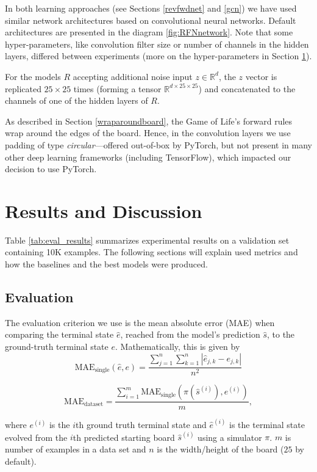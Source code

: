 \documentclass[conference]{IEEEtran}
\begin{document}
In both learning approaches (see Sections \ref{revfwdnet} and \ref{gcn}) we have used similar network architectures based on convolutional neural networks. Default architectures are presented in the diagram \ref{fig:RFNnetwork}. Note that some hyper-parameters, like convolution filter size or number of channels in the hidden layers, differed between experiments (more on the hyper-parameters in Section \ref{results}).

For the models $R$ accepting additional noise input $z \in \mathbb{R}^d$, the $z$ vector is replicated $25 \times 25$ times (forming a tensor $\mathbb{R}^{d\times25\times25}$) and concatenated to the channels of one of the hidden layers of $R$.

As described in Section \ref{wraparoundboard}, the Game of Life's forward rules wrap around the edges of the board. Hence, in the convolution layers we use padding of type {\it circular}---offered out-of-box by PyTorch, but not present in many other deep learning frameworks (including TensorFlow), which impacted our decision to use PyTorch.


\section{Results and Discussion}
\label{results}
Table \ref{tab:eval_results} summarizes experimental results on a validation set containing 10K examples. The following sections will explain used metrics and how the baselines and the best models were produced.

\subsection{Evaluation}
\label{evaluation}
The evaluation criterion we use is the mean absolute error (MAE) when comparing the terminal state $\hat{e}$, reached from the model's prediction $\hat{s}$, to the ground-truth terminal state $e$. Mathematically, this is given by
$$\mathrm{MAE}_{\text{single}}(\hat e, e) = \frac{ \sum_{j=1}^{n}\sum_{k=1}^{n}|\hat e_{j,k} - e_{j,k}|}{n^2}$$

$$\mathrm{MAE}_{\text{dataset}} = \frac{\sum_{i=1}^{m} \mathrm{MAE}_{\text{single}}(\pi(\hat s^{(i)}), e^{(i)})}{m},$$


where $e^{(i)}$ is the $i$th ground truth terminal state and $\hat e^{(i)}$ is the terminal state evolved from the $i$th predicted starting board $\hat s^{(i)}$ using a simulator $\pi$. $m$ is number of examples in a data set and $n$ is the width/height of the board ($25$ by default).
\end{document}
